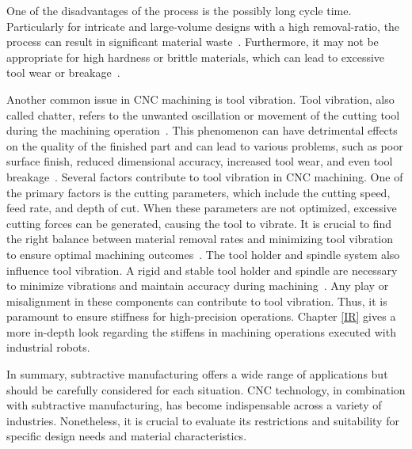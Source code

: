 One of the disadvantages of the process is the possibly long cycle time. Particularly for intricate and large-volume designs with a high removal-ratio, the process can result in significant material waste~\cite{Faludi.2015}. Furthermore, it may not be appropriate for high hardness or brittle materials, which can lead to excessive tool wear or breakage~\cite{Hesser.2019}. 

Another common issue in \acrshort{CNC} machining is tool vibration. Tool vibration, also called chatter, refers to the unwanted oscillation or movement of the cutting tool during the machining operation~\cite{YUE.2019}. This phenomenon can have detrimental effects on the quality of the finished part and can lead to various problems, such as poor surface finish, reduced dimensional accuracy, increased tool wear, and even tool breakage~\cite{Aslan.2018}. Several factors contribute to tool vibration in \acrshort{CNC} machining. One of the primary factors is the cutting parameters, which include the cutting speed, feed rate, and depth of cut. When these parameters are not optimized, excessive cutting forces can be generated, causing the tool to vibrate. It is crucial to find the right balance between material removal rates and minimizing tool vibration to ensure optimal machining outcomes~\cite{GiorgioBort.2016}.
The tool holder and spindle system also influence tool vibration. A rigid and stable tool holder and spindle are necessary to minimize vibrations and maintain accuracy during machining~\cite{Wan.2019}. Any play or misalignment in these components can contribute to tool vibration. %
Thus, it is paramount to ensure stiffness for high-precision operations.
Chapter \ref{IR} gives a more in-depth look regarding the stiffens in machining operations executed with industrial robots.

In summary, subtractive manufacturing offers a wide range of applications but should be carefully considered for each situation. CNC technology, in combination with subtractive manufacturing, has become indispensable across a variety of industries. Nonetheless, it is crucial to evaluate its restrictions and suitability for specific design needs and material characteristics.


